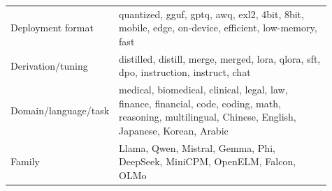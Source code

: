 \begin{table}[t]
\begin{tabular}{p{0.16\linewidth}p{0.24\linewidth}p{0.31\linewidth}p{0.20\linewidth}}
\multicolumn{1}{p{0.16\linewidth}}{Deployment format} & \multicolumn{3}{p{0.78\linewidth}}{quantized, gguf, gptq, awq, exl2, 4bit, 8bit, mobile, edge, on-device, efficient, low-memory, fast} \\
\multicolumn{1}{p{0.16\linewidth}}{Derivation/tuning} & \multicolumn{3}{p{0.78\linewidth}}{distilled, distill, merge, merged, lora, qlora, sft, dpo, instruction, instruct, chat} \\
\multicolumn{1}{p{0.16\linewidth}}{Domain/language/task} & \multicolumn{3}{p{0.78\linewidth}}{medical, biomedical, clinical, legal, law, finance, financial, code, coding, math, reasoning, multilingual, Chinese, English, Japanese, Korean, Arabic} \\
\multicolumn{1}{p{0.16\linewidth}}{Family} & \multicolumn{3}{p{0.78\linewidth}}{Llama, Qwen, Mistral, Gemma, Phi, DeepSeek, MiniCPM, OpenELM, Falcon, OLMo} \\
\bottomrule
\end{tabular}
\end{table}
